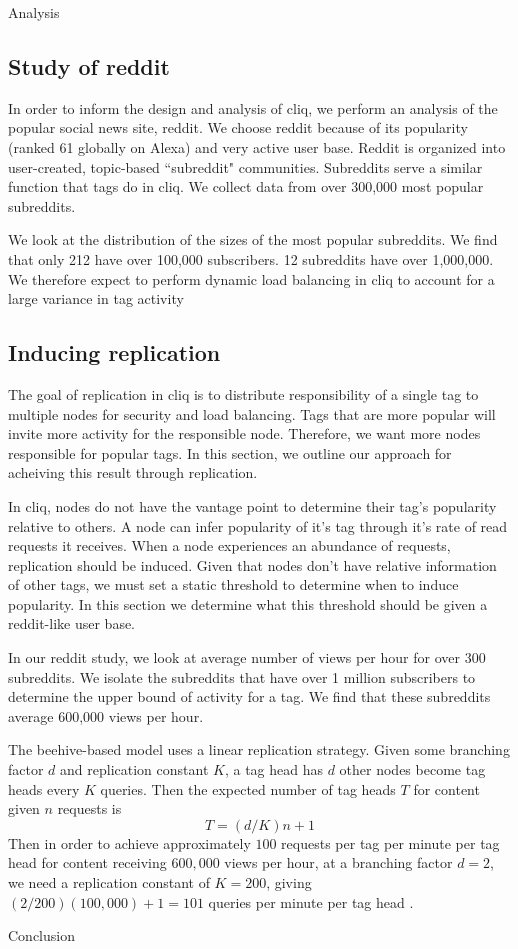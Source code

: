\documentclass{sig-alternate}
\begin{document}
\begin{section}{Analysis}

\subsection{Study of reddit}
\label{subsec:redditstudy}

In order to inform the design and analysis of cliq, we perform an analysis of the popular social news site, reddit. We choose reddit because of its popularity (ranked 61 globally on Alexa) and very active user base. Reddit is organized into user-created, topic-based ``subreddit" communities. Subreddits serve a similar function that tags do in cliq. We collect data from over 300,000 most popular subreddits.

We look at the distribution of the sizes of the most popular subreddits. We find that only 212 have over 100,000 subscribers. 12 subreddits have over 1,000,000. We therefore expect to perform dynamic load balancing in cliq 
to account for a large variance in tag activity

\subsection{Inducing replication}
\label{subsec:inducereplication} 
The goal of replication in cliq is to distribute responsibility of a single tag to multiple nodes for security and load balancing. Tags that are more popular will invite more activity for the responsible node. Therefore, we want more nodes responsible for popular tags. In this section, we outline our approach for acheiving this result through replication.

In cliq, nodes do not have the vantage point to determine their tag's popularity relative to others. A node can infer popularity of it's tag through it's rate of read requests it receives. When a node experiences an abundance of requests, replication should be induced. Given that nodes don't have relative information of other tags, we must set a static threshold to determine when to induce popularity. In this section we determine what this threshold should be given a reddit-like user base. 

In our reddit study, we look at average number of views per hour for over 300 subreddits. We isolate the subreddits that have over 1 million subscribers to determine the upper bound of activity for a tag. We find that these subreddits average 600,000 views per hour. 

The beehive-based model uses a linear replication strategy. Given some
branching factor $d$ and replication constant $K$, a tag head has $d$
other nodes become tag heads every $K$ queries. Then the expected
number of tag heads $T$ for content given $n$ requests is
\[ 
T = (d/K)n + 1
\]
Then in order to achieve approximately $100$ requests per tag per
minute per tag head for content receiving $600,000$ views per hour, at
a branching factor $d = 2$, we need a replication constant of $K =
200$, giving $(2/200)(100,000) + 1 = 101$ queries per minute per tag
head \cite{ramasubramanian2004beehive}.

\end{section}

\begin{section}{Conclusion}
  
\end{section}



\end{document}
